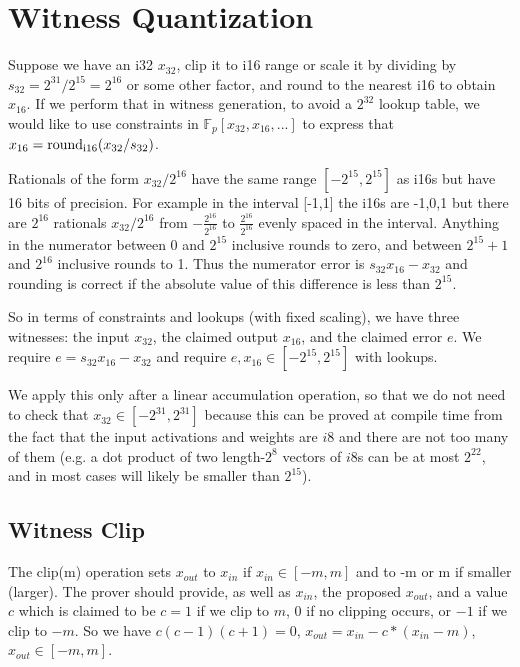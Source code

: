 \documentclass[12pt]{amsart}
\newcommand{\FF}{\mathbb{F}}
\theoremstyle{plain}
\theoremstyle{definition}
\theoremstyle{definition}
\theoremstyle{definition}
\theoremstyle{definition}
\theoremstyle{definition}
\begin{document}
\section{Witness Quantization} \label{sectionWQ}
Suppose we have an i32 $x_{32}$, clip it to i16 range or scale it by dividing by $s_{32} = 2^{31}/2^{15} = 2^{16}$ or some other factor, and round to the nearest i16 to obtain $x_{16}$. If we perform that in witness generation, to avoid a $2^{32}$ lookup table, we would like to use constraints in $\FF_p[x_{32}, x_{16}, ...]$ to express that $x_{16} = {\rm round_{i16}}(x_{32}/s_{32})$.

Rationals of the form $x_{32} / 2^{16}$ have the same range $[-2^{15}, 2^{15}]$ as i16s but have 16 bits of precision. 
For example in the interval [-1,1] the i16s are -1,0,1 but there are $2^{16}$ rationals $x_{32} / 2^{16}$ from $-\frac{2^{16}}{2^{16}}$ to $\frac{2^{16}}{2^{16}}$ evenly spaced in the interval.
Anything in the numerator between 0 and $2^{15}$ inclusive rounds to zero, and between $2^{15}+1$ and $2^{16}$ inclusive rounds to 1.
Thus the numerator error is $s_{32} x_{16} - x_{32}$ and rounding is correct if the absolute value of this difference is less than $2^{15}$.

So in terms of constraints and lookups (with fixed scaling), we have three witnesses: the input $x_{32}$, the claimed output $x_{16}$, and the claimed error $e$. We require $e = s_{32} x_{16} - x_{32}$ and require $e,x_{16} \in [-2^{15},2^{15}]$ with lookups. 

We apply this only after a linear accumulation operation, so that we do not need to check that $x_{32} \in [-2^{31},2^{31}]$ because this can be proved at compile time from the fact that the input activations and weights are $i8$ and there are not too many of them (e.g. a dot product of two length-$2^8$ vectors of $i8$s can be at most $2^{22}$, and in most cases will likely be smaller than $2^{15}$).



\subsection{Witness Clip} \label{sectionWClip}
The clip(m) operation sets $x_{out}$ to $x_{in}$ if $x_{in} \in [-m,m]$ and to -m or m if smaller (larger).  The prover should provide, as well as $x_{in}$, the proposed $x_{out}$, and a value $c$ which is claimed to be  $c = 1$ if we clip to $m$, $0$ if no clipping occurs, or  $-1$ if we clip to $-m$.  So we have $c(c-1)(c+1) = 0$, $x_{out} = x_{in} - c*(x_{in} - m)$, $x_{out} \in [-m,m]$.
\end{document}
